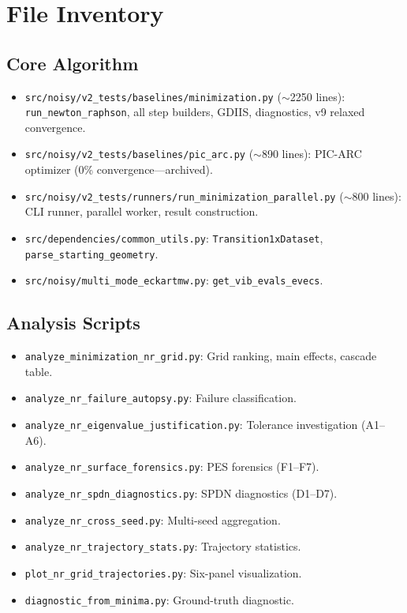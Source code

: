 \documentclass[11pt,a4paper]{article}
\begin{document}
\section{File Inventory}
\label{sec:files}

\subsection{Core Algorithm}

\begin{itemize}
  \item \texttt{src/noisy/v2\_tests/baselines/minimization.py} ($\sim$2250 lines): \texttt{run\_newton\_raphson}, all step builders, GDIIS, diagnostics, v9 relaxed convergence.
  \item \texttt{src/noisy/v2\_tests/baselines/pic\_arc.py} ($\sim$890 lines): PIC-ARC optimizer (0\% convergence---archived).
  \item \texttt{src/noisy/v2\_tests/runners/run\_minimization\_parallel.py} ($\sim$800 lines): CLI runner, parallel worker, result construction.
  \item \texttt{src/dependencies/common\_utils.py}: \texttt{Transition1xDataset}, \texttt{parse\_starting\_geometry}.
  \item \texttt{src/noisy/multi\_mode\_eckartmw.py}: \texttt{get\_vib\_evals\_evecs}.
\end{itemize}

\subsection{Analysis Scripts}

\begin{itemize}
  \item \texttt{analyze\_minimization\_nr\_grid.py}: Grid ranking, main effects, cascade table.
  \item \texttt{analyze\_nr\_failure\_autopsy.py}: Failure classification.
  \item \texttt{analyze\_nr\_eigenvalue\_justification.py}: Tolerance investigation (A1--A6).
  \item \texttt{analyze\_nr\_surface\_forensics.py}: PES forensics (F1--F7).
  \item \texttt{analyze\_nr\_spdn\_diagnostics.py}: SPDN diagnostics (D1--D7).
  \item \texttt{analyze\_nr\_cross\_seed.py}: Multi-seed aggregation.
  \item \texttt{analyze\_nr\_trajectory\_stats.py}: Trajectory statistics.
  \item \texttt{plot\_nr\_grid\_trajectories.py}: Six-panel visualization.
  \item \texttt{diagnostic\_from\_minima.py}: Ground-truth diagnostic.
\end{itemize}
\end{document}
